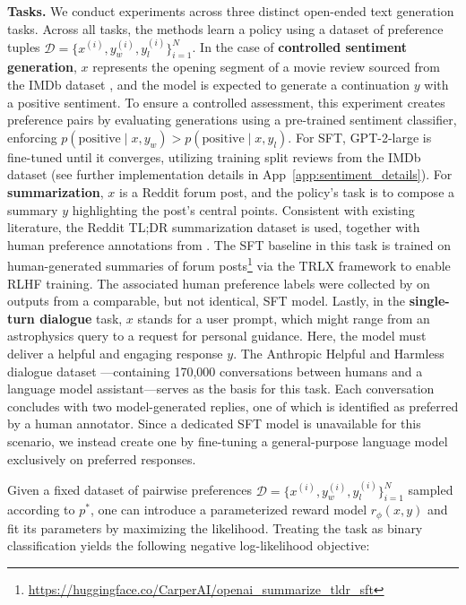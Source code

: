 \textbf{Tasks.} We conduct experiments across three distinct open-ended text generation tasks. Across all tasks, the methods learn a policy using a dataset of preference tuples $\mathcal{D}=\bigl\{x^{(i)}, y_w^{(i)}, y_l^{(i)}\bigr\}_{i=1}^N$. In the case of \textbf{controlled sentiment generation}, $x$ represents the opening segment of a movie review sourced from the IMDb dataset \cite{maas-EtAl:2011:ACL-HLT2011}, and the model is expected to generate a continuation $y$ with a positive sentiment. To ensure a controlled assessment, this experiment creates preference pairs by evaluating generations using a pre-trained sentiment classifier, enforcing $p(\text{positive}\mid x,y_w)>p(\text{positive}\mid x,y_l)$. For SFT, GPT-2-large is fine-tuned until it converges, utilizing training split reviews from the IMDb dataset (see further implementation details in App~\ref{app:sentiment_details}). For \textbf{summarization}, $x$ is a Reddit forum post, and the policy's task is to compose a summary $y$ highlighting the post’s central points. Consistent with existing literature, the Reddit TL;DR summarization dataset \citep{volske-etal-2017-tl} is used, together with human preference annotations from \citeauthor{stiennon2022learning}. The SFT baseline in this task is trained on human-generated summaries of forum posts\footnote{\url{https://huggingface.co/CarperAI/openai_summarize_tldr_sft}} via the TRLX framework \citep{leandro_von_werra_2023_7790115} to enable RLHF training. The associated human preference labels were collected by \citeauthor{stiennon2022learning} on outputs from a comparable, but not identical, SFT model. Lastly, in the \textbf{single-turn dialogue} task, $x$ stands for a user prompt, which might range from an astrophysics query to a request for personal guidance. Here, the model must deliver a helpful and engaging response $y$. The Anthropic Helpful and Harmless dialogue dataset \citep{bai2022training}—containing 170,000 conversations between humans and a language model assistant—serves as the basis for this task. Each conversation concludes with two model-generated replies, one of which is identified as preferred by a human annotator. Since a dedicated SFT model is unavailable for this scenario, we instead create one by fine-tuning a general-purpose language model exclusively on preferred responses.

Given a fixed dataset of pairwise preferences $\mathcal{D}=\bigl\{x^{(i)}, y_w^{(i)}, y_l^{(i)}\bigr\}_{i=1}^N$ sampled according to $p^*$, one can introduce a parameterized reward model $r_{\phi}(x, y)$ and fit its parameters by maximizing the likelihood. Treating the task as binary classification yields the following negative log-likelihood objective:

